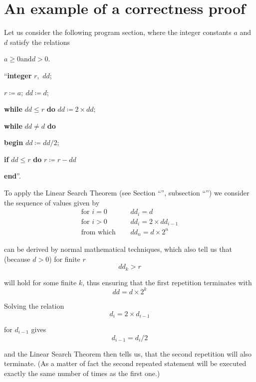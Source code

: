 \section{An example of a correctness proof}

Let us consider the following program section, where the integer constants $a$ and $d$ satisfy the relations
\medskip

{
	\setlength{\parindent}{8em}
	$a \geqslant 0$\quad and\quad $d > 0$.
	
	\hspace{-.5em}``\textbf{integer} $r$,\ $dd$;
	
	$r \coloneq a;\ dd \coloneq d$;
	
	\textbf{while} $dd \leqslant r$ \textbf{do} $dd \coloneq 2\times dd;$
	
	\textbf{while} $dd \neq d$ \textbf{do}
	
	\quad \textbf{begin} $dd \coloneq dd/2;$
	
	\quad\quad \textbf{if} $dd \leqslant r$ \textbf{do} $r \coloneq r - dd$
	
	\quad\textbf{end}''.
}
\medskip

To apply the Linear Search Theorem (see Section ``'', subsection ``'') we consider the sequence of values given by
\begin{equation}
	\label{eq:example-initial}
	\begin{split}
		\text{for } i = 0\quad & dd_i = d \\
		\text{for } i > 0\quad & dd_i = 2\times dd_{i - 1}\\
		\text{from which }\quad & dd_n = d\times 2^n
	\end{split}
\end{equation}

\noindent
can be derived by normal mathematical techniques, which also tell us that (because $d > 0$) for finite $r$
$$
dd_k > r
$$

\noindent
will hold for some finite $k$, thus ensuring that the first repetition terminates with
$$
dd = d\times 2^k
$$

Solving the relation
$$
d_i = 2\times d_{i-1}
$$

for $d_{i-1}$ gives
$$
d_{i-1} = d_i/2
$$

\noindent
and the Linear Search Theorem then tells us, that the second repetition will also terminate. (As a matter of fact the second repeated statement will be executed exactly the same number of times as the first one.)

